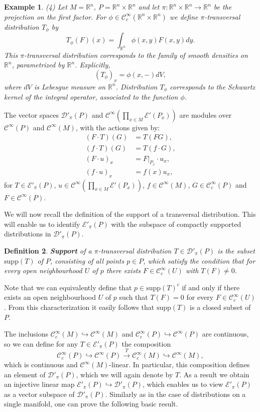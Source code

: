 \documentclass[a4paper]{amsart}
\newtheorem{dfn}{Definition}[section]
\newtheorem{ex}[dfn]{Example}
\newcommand{\RR}{\mathbb{R}}
\newcommand{\cD}{\mathcal{D}}
\newcommand{\cE}{\mathcal{E}}
\newcommand{\supp}{\mathord{\mathrm{supp}}}
\newcommand{\C}{\mathord{\mathcal{C}^{\infty}}}
\newcommand{\Cc}{\mathord{\mathcal{C}^{\infty}_{c}}}
\begin{document}
\begin{ex}
(4) Let $M=\RR^{n}$, $P=\RR^{n}\times\RR^{n}$ and let $\pi:\RR^{n}\times\RR^{n}\to\RR^{n}$ be the projection on the first factor. For  
$\phi\in\Cc(\RR^{n}\times\RR^{n})$ we define $\pi$-transversal distribution $T_{\phi}$ by
\[
T_{\phi}(F)(x)=\int_{\RR^{n}}\phi(x,y)F(x,y)dy.
\]
This $\pi$-transversal distribution corresponds to the family of smooth densities on $\RR^{n}$, parametrized by $\RR^{n}$. Explicitly,
\[
(T_{\phi})_{x}=\phi(x,-)dV,
\]
where $dV$ is Lebesgue measure on $\RR^{n}$. Distribution $T_{\phi}$ corresponds to the Schwartz kernel of the integral operator, associated to
the function $\phi$.
\end{ex}

The vector spaces $\cD'_{\pi}(P)$ and $\C(\prod_{x\in M}\cE'(P_{x}))$ are modules over $\C(P)$ and $\C(M)$, with
the actions given by:
\begin{align*}
(F\cdot T)(G)&=T(FG), \\
(f\cdot T)(G)&=T(f\cdot G), \\
(F\cdot u)_{x}&=F|_{P_{x}}\cdot u_{x}, \\
(f\cdot u)_{x}&=f(x)u_{x},
\end{align*}
for $T\in\cE'_{\pi}(P)$, $u\in\C(\prod_{x\in M}\cE'(P_{x}))$, $f\in\C(M)$, $G\in\Cc(P)$ and $F\in\C(P)$.

We will now recall the definition of the support of a transversal distribution. This will enable us to identify 
$\cE'_{\pi}(P)$ with the subspace of compactly supported distributions in $\cD'_{\pi}(P)$.

\begin{dfn}
\textbf{Support} of a $\pi$-transversal distribution $T\in\cD'_{\pi}(P)$ is the subset $\supp(T)$ of $P$, consisting of all points 
$p\in P$, which satisfy the condition that for every open neighbourhood $U$ of $p$ there exists $F\in\Cc(U)$ with $T(F)\neq 0$.
\end{dfn}
Note that we can equivalently define that $p\in\supp(T)^{c}$ if and only if there exists an open
neighbourhood $U$ of $p$ such that $T(F)=0$ for every $F\in\Cc(U)$. From this characterization it easily follows
that $\supp(T)$ is a closed subset of $P$.

The inclusions $\Cc(M)\hookrightarrow\C(M)$ and $\Cc(P)\hookrightarrow\C(P)$ are continuous, so we can define 
for any $T\in\cE'_{\pi}(P)$ the composition
\[
\Cc(P)\hookrightarrow\C(P)\overset{T}{\longrightarrow}\Cc(M)\hookrightarrow\C(M),
\]
which is continuous and $\C(M)$-linear. In particular, this composition defines an element of $\cD'_{\pi}(P)$, which
we will again denote by $T$. As a result we obtain an injective linear map $\cE'_{\pi}(P)\hookrightarrow\cD'_{\pi}(P)$,
which enables us to view $\cE'_{\pi}(P)$ as a vector subspace of $\cD'_{\pi}(P)$.
Similarly as in the case of distributions on a single manifold, one can prove the following basic result.
\end{document}
